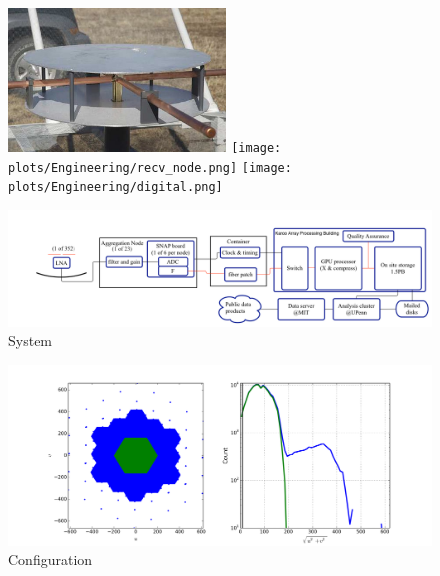 \documentclass[ars]{/Users/daviddeboer1/Documents/Papers/Copernicus_LaTeX_Package_v_2_7/copernicus}
\begin{document}
\begin{figure}[t]
    \centering
        \includegraphics[height=1.5in]{plots/new_antenna_closeup.jpg}
        \texttt{[image: plots/Engineering/recv\_node.png]}
        \texttt{[image: plots/Engineering/digital.png]}
    \label{fig:components}
\end{figure}


\begin{figure}[t]
\vspace*{2mm}
\begin{center}
\includegraphics[width=12cm]{plots/HERA_high_level_block_diagram.png}
\end{center}
\caption{System  \label{fig:systemOverview}}
\end{figure}

\begin{figure}[t]
\vspace*{2mm}
\begin{center}
\includegraphics[width=12cm]{plots/config.png}
\end{center}
\caption{Configuration  \label{fig:config}}
\end{figure}
\end{document}
